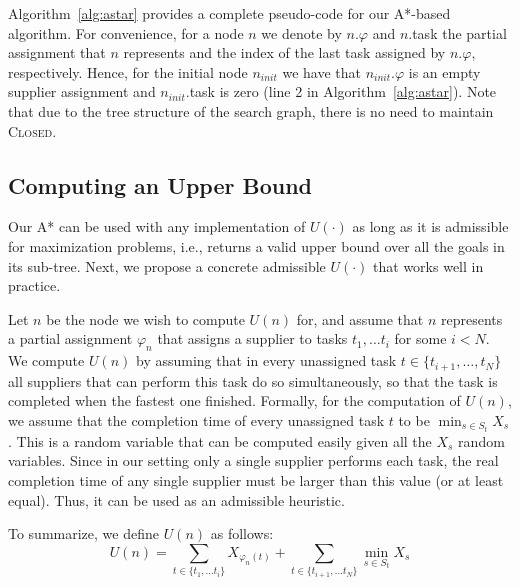 \documentclass[letterpaper]{article} %
\newcommand{\astar}{\textsc{A*}\xspace}
\newcommand{\closed}{\textsc{Closed}\xspace}
\newcommand\Roni[1]{\nb{\textbf{Roni:}}{blue}{#1}}
\begin{document}
Algorithm~\ref{alg:astar} provides a complete pseudo-code for our \astar-based algorithm. For convenience, for a node $n$ we denote by $n.\varphi$ and $n$.task
the partial assignment that $n$ represents and the index of the last task assigned by $n.\varphi$, respectively. Hence, for the initial node $n_{init}$ we have that $n_{init}.\varphi$ is an empty supplier assignment and $n_{init}.$task is zero (line 2 in Algorithm~\ref{alg:astar}). Note that due to the tree structure of the search graph, there is no need to maintain \closed.


\subsection{Computing an Upper Bound}

Our \astar can be used with any implementation of $U(\cdot)$ as long as it is admissible for maximization problems, i.e., returns a valid upper bound over all the goals in its sub-tree. Next, we propose a concrete admissible $U(\cdot)$ that works well in practice.

Let $n$ be the node we wish to compute $U(n)$ for, and assume that $n$ represents a partial assignment $\varphi_n$ that assigns a supplier to tasks $t_1,\ldots t_i$ for some $i<N$.
We compute $U(n)$ by assuming that in every unassigned task $t\in \{t_{i+1},\ldots,t_{N}\}$
all suppliers that can perform this task do so simultaneously, so that the task is completed
when the fastest one finished. Formally, for the computation of $U(n)$, we assume that the completion time of every unassigned task $t$ to be $\min_{s\in S_t} X_s$. This is a random variable that can be computed easily given all the $X_s$ random variables. Since in our setting only a single supplier performs each task, the real completion time of any single supplier must be larger than this value (or at least equal). Thus, it can be used as an admissible heuristic.

To summarize, we define $U(n)$ as follows:
\begin{equation}
U(n)=\sum_{t\in \{t_1,\ldots t_i\}} X_{\varphi_n(t)} + \sum_{t\in \{t_{i+1},\ldots t_{N}\}} \min_{s\in S_t} X_s
\label{eq:heuristic}
\end{equation}

\end{document}
